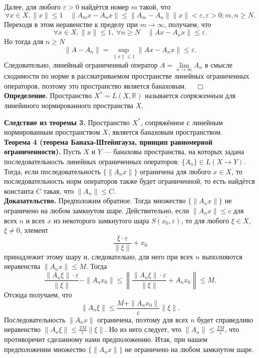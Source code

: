 \documentclass[12pt,a4paper, titlepage]{article}
\begin{document}
Далее, для любого $\varepsilon > 0$ найдётся номер $m$ такой, что 
$$
\forall x \in X, \|x\| \leqslant 1 \quad \|A_m x - A_n x\| \leqslant \|A_m - A_n\| \|x\| < \varepsilon , \varepsilon > 0; m, n \geqslant N.
$$
Переходя в этом неравенстве к пределу при $m \to \infty$, получаем, что
$$
\forall x \in X, \|x\| \leqslant 1, \; \forall n \geqslant N \quad \|Ax - A_n x\| \leqslant \varepsilon. 
$$
Но тогда для $n \geqslant N$
$$
\|A - A_n\| = \sup_{\|x\| \leqslant 1} \|Ax - A_n x\| \leqslant \varepsilon.
$$
Следовательно, линейный ограниченный оператор $A = \lim\limits_{n\to\infty} A_n$ в смысле сходимости по норме в рассматриваемом пространстве линейных ограниченных операторов, поэтому это пространство является банаховым. $\quad \Box$\\












\textbf{Определение.} Пространство $X^* = L(X, \mathbb{R})$ называется \textit{сопряженным} для линейиного нормированного пространства $X$.

\textbf{Следствие из теоремы 3.} Пространство $X^*$, сопряжённое с линейным нормированным пространством $X$, является банаховым пространством.\\

\textbf{Теорема 4 (теорема Банаха-Штейнгауза, принцип равномерной ограниченности).}
Пусть $X$ и $Y$ --- банаховы пространства, на которых задана последовательность линейных ограниченных операторов: $\{A_n\} \in L(X\to Y)$. Тогда, если последовательность $\{\|A_n x\|\}$ ограничена для любого $x\in X$, то последовательность норм операторов также будет ограниченной, то есть найдётся константа $C$ такая, что $\|A_n\| \leqslant C$.\\
\textbf{Доказательство.} Предположим обратное. Тогда множество $\lbrace \|A_n x\| \rbrace$ не ограничено на любом замкнутом шаре. Действительно, если $\|A_n x\| \leqslant c$ для всех $n$ и всех $x$ из некоторого замкнутого шара $\overline{S(x_0, \varepsilon)}$, то для любого $\xi \in X$, $\xi \neq 0$, элемент
$$
\frac {\xi \cdot \varepsilon}{\|\xi\|} + x_0
$$
принадлежит этому шару и, следовательно, для него при всех $n$ выполняются неравенства $\|A_n x\| \leqslant M$. Тогда
$$
\frac{\|A_n \xi\| \cdot \varepsilon} {\|\xi\|} - \|A_n x_0\| \leqslant \left\| \frac{\|A_n \xi\| \cdot \varepsilon} {\|\xi\|} + A_n x_0 \right\| \leqslant M.
$$
Отсюда получаем, что
$$
\|A_n \xi\| \leqslant \frac{M + \|A_n x_0\|}{\varepsilon} \|\xi\|.
$$
Последовательность $\|A_n x\|$ ограничена, поэтому для всех $n$ будет справедливо неравенство $\|A_n \xi\| \leqslant \frac{2M}{\varepsilon}\|\xi\|$. Но из него следует, что $\|A_n\| \leqslant \frac{2M}{\varepsilon}$, что противоречит сделанному нами предположению. Итак, при нашем предположении множество $\lbrace \|A_n x\| \rbrace$ не ограничено на любом замкнутом шаре.\\
\end{document}

